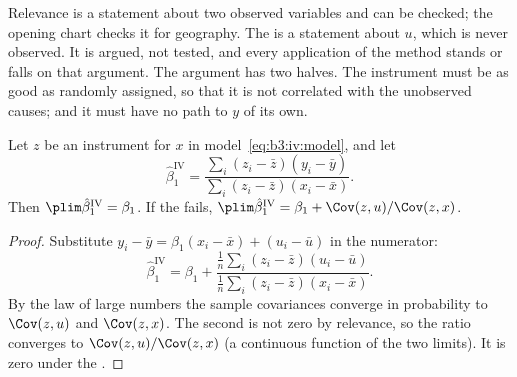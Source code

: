 Relevance is a statement about two observed variables and can be checked; the
opening chart checks it for geography. The  is a
statement about $u$, which is never observed. It is argued, not tested, and
every application of the method stands or falls on that argument. The
argument has two halves. The instrument must be as good as randomly assigned,
so that it is not correlated with the unobserved causes; and it must have no
path to $y$ of its own.

\begin{omfigure}
\par{}
\end{omfigure}

\begin{proposition}\label{prop:b3:instrumental-variables:consistency}
Let $z$ be an instrument for $x$ in model~\eqref{eq:b3:iv:model}, and let
\[
  \hat\beta_1^{\mathrm{IV}} = \frac{\sum_i (z_i - \bar z)(y_i - \bar y)}{\sum_i (z_i - \bar z)(x_i - \bar x)}.
\]
Then $\plim \hat\beta_1^{\mathrm{IV}} = \beta_1$. If the 
fails, $\plim \hat\beta_1^{\mathrm{IV}} = \beta_1 + \Cov(z, u)/\Cov(z, x)$.
\end{proposition}

\begin{proof}
Substitute $y_i - \bar y = \beta_1 (x_i - \bar x) + (u_i - \bar u)$ in the
numerator:
\[
  \hat\beta_1^{\mathrm{IV}} = \beta_1 + \frac{\frac1n \sum_i (z_i - \bar z)(u_i - \bar u)}{\frac1n \sum_i (z_i - \bar z)(x_i - \bar x)}.
\]
By the law of large numbers the sample covariances converge in probability to
$\Cov(z, u)$ and $\Cov(z, x)$. The second is not zero by relevance, so the
ratio converges to $\Cov(z, u)/\Cov(z, x)$ (a continuous function of the two
limits). It is zero under the .
\end{proof}

